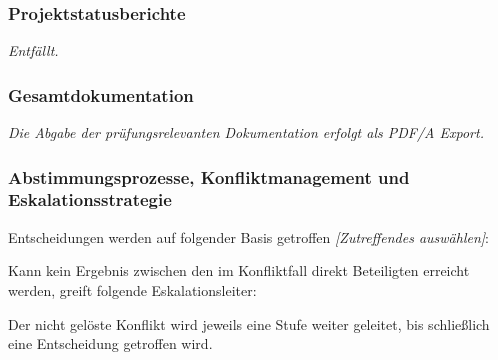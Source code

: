\subsubsection{Projektstatusberichte}

\textit{Entfällt.}


\subsubsection{Gesamtdokumentation}

\textit{Die Abgabe der prüfungsrelevanten Dokumentation erfolgt als PDF/A Export.}


\subsubsection{Abstimmungsprozesse, Konfliktmanagement und Eskalationsstrategie}

Entscheidungen werden auf folgender Basis getroffen \textit{[Zutreffendes auswählen]}:


Kann kein Ergebnis zwischen den im Konfliktfall direkt Beteiligten erreicht werden, greift folgende Eskalationsleiter: 


Der nicht gelöste Konflikt wird jeweils eine Stufe weiter geleitet, bis schließlich eine Entscheidung getroffen wird.
